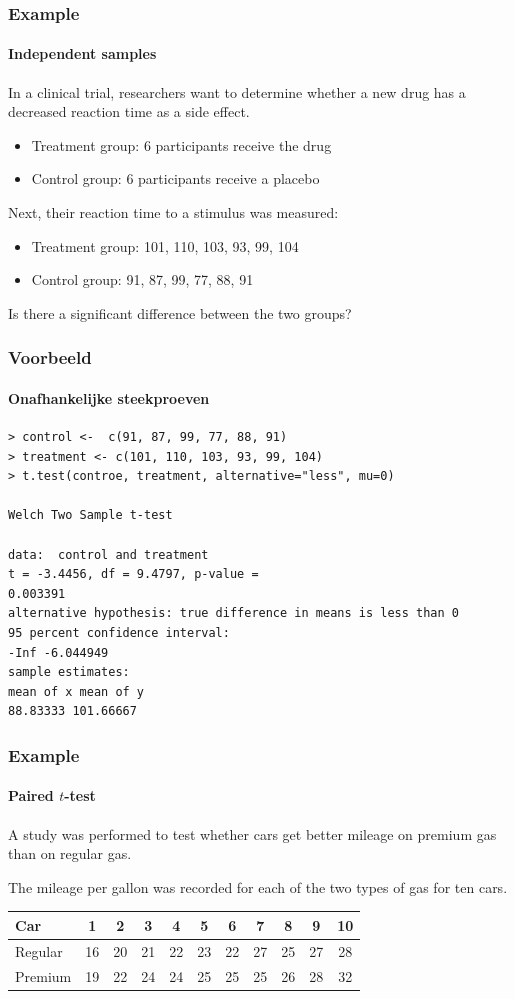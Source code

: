 \documentclass{beamer}
\begin{document}
\begin{frame}
  \frametitle{Example}
  \framesubtitle{Independent samples}
  
  In a clinical trial, researchers want to determine whether a new drug has a decreased reaction time as a side effect.
  
  \begin{itemize}
    \item Treatment group: 6 participants receive the drug
    \item Control group: 6 participants receive a placebo
  \end{itemize}
  
  Next, their reaction time to a stimulus was measured:
  
  \begin{itemize}
    \item Treatment group: 101, 110, 103, 93, 99, 104
    \item Control group: 91, 87, 99, 77, 88, 91
  \end{itemize}
  
  Is there a significant difference between the two groups?
\end{frame}

\begin{frame}[fragile]
  \frametitle{Voorbeeld}
  \framesubtitle{Onafhankelijke steekproeven}

\footnotesize
\begin{verbatim}
> control <-  c(91, 87, 99, 77, 88, 91)
> treatment <- c(101, 110, 103, 93, 99, 104)
> t.test(controe, treatment, alternative="less", mu=0)

Welch Two Sample t-test

data:  control and treatment
t = -3.4456, df = 9.4797, p-value =
0.003391
alternative hypothesis: true difference in means is less than 0
95 percent confidence interval:
-Inf -6.044949
sample estimates:
mean of x mean of y 
88.83333 101.66667
\end{verbatim}
\end{frame}


\begin{frame}
  \frametitle{Example}
  \framesubtitle{Paired $t$-test}
  
  A study was performed to test whether cars get better mileage on premium gas than on regular gas. 
  
  The mileage per gallon was recorded for each of the two types of gas for ten cars.
  
  \vspace{.5cm}
  \centering
  \begin{tabular}{|l|c|c|c|c|c|c|c|c|c|c|}
  	\hline
  	Car     & 1  & 2  & 3  & 4  & 5  & 6  & 7  & 8  & 9  & 10 \\ \hline
  	Regular & 16 & 20 & 21 & 22 & 23 & 22 & 27 & 25 & 27 & 28 \\ \hline
  	Premium & 19 & 22 & 24 & 24 & 25 & 25 & 25 & 26 & 28 & 32 \\ \hline
  \end{tabular} 
\end{frame}
\end{document}
